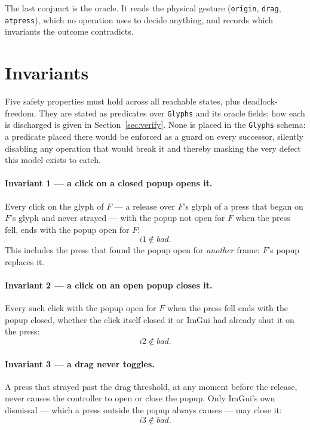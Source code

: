 \documentclass[a4paper,10pt,fleqn]{article}
\begin{document}
The last conjunct is the oracle.  It reads the physical gesture
(\texttt{origin}, \texttt{drag}, \texttt{atpress}), which no operation uses to
decide anything, and records which invariants the outcome contradicts.

\section{Invariants}
\label{sec:inv}

Five safety properties must hold across all reachable states, plus
deadlock-freedom.  They are stated as predicates over \texttt{Glyphs} and its
oracle fields; how each is discharged is given in
Section~\ref{sec:verify}.  None is placed in the \texttt{Glyphs} schema: a
predicate placed there would be enforced as a guard on every successor, silently
disabling any operation that would break it and thereby masking the very defect
this model exists to catch.

\paragraph{Invariant 1 --- a click on a closed popup opens it.}
Every click on the glyph of $F$ --- a release over $F$'s glyph of a press that
began on $F$'s glyph and never strayed --- with the popup not open for $F$ when
the press fell, ends with the popup open for $F$:
\[
  i1 \notin bad.
\]
This includes the press that found the popup open for \emph{another} frame:
$F$'s popup replaces it.

\paragraph{Invariant 2 --- a click on an open popup closes it.}
Every such click with the popup open for $F$ when the press fell ends with the
popup closed, whether the click itself closed it or ImGui had already shut it on
the press:
\[
  i2 \notin bad.
\]

\paragraph{Invariant 3 --- a drag never toggles.}
A press that strayed past the drag threshold, at any moment before the release,
never causes the controller to open or close the popup.  Only ImGui's own
dismissal --- which a press outside the popup always causes --- may close it:
\[
  i3 \notin bad.
\]
\end{document}
